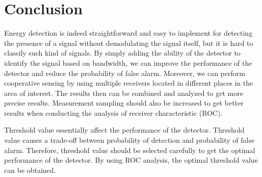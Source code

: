 \chapter{Conclusion}

Energy detection is indeed straightforward and easy to implement for detecting the presence of a signal without demodulating the signal itself, but it is hard to classify such kind of signals. By simply adding the ability of the detector to identify the signal based on bandwidth, we can improve the performance of the detector and reduce the probability of false alarm. Moreover, we can perform cooperative sensing by using multiple receivers located in different places in the area of interest. The results then can be combined and analyzed to get more precise results. Measurement sampling should also be increased to get better results when conducting the analysis of receiver characteristic (ROC).

Threshold value essentially affect the performance of the detector. Threshold value causes a trade-off between probability of detection and probability of false alarm. Therefore, threshold value should be selected carefully to get the optimal performance of the detector. By using ROC analysis, the optimal threshold value can be obtained.